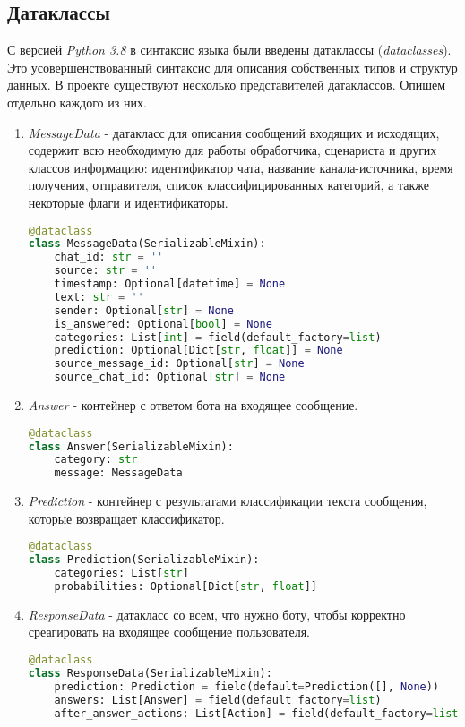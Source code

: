     \subsection{Датаклассы}
    С версией \textit{Python 3.8} в синтаксис языка были введены датаклассы (\textit{dataclasses}).
    Это усовершенствованный синтаксис для описания собственных типов и структур данных.
    В проекте существуют несколько представителей датаклассов. Опишем отдельно каждого из них.
    \begin{enumerate}
        \item \textit{MessageData} - датакласс для описания сообщений входящих и исходящих,
        содержит всю необходимую для работы обработчика, сценариста и других классов информацию:
        идентификатор чата, название канала-источника, время получения, отправителя,
        список классифицированных категорий, а также некоторые флаги и идентификаторы.
\begin{lstlisting}[language=Python]
@dataclass
class MessageData(SerializableMixin):
    chat_id: str = ''
    source: str = ''
    timestamp: Optional[datetime] = None
    text: str = ''
    sender: Optional[str] = None
    is_answered: Optional[bool] = None
    categories: List[int] = field(default_factory=list)
    prediction: Optional[Dict[str, float]] = None
    source_message_id: Optional[str] = None
    source_chat_id: Optional[str] = None
\end{lstlisting}

        \item \textit{Answer} - контейнер с ответом бота на входящее сообщение.
\begin{lstlisting}[language=Python]
@dataclass
class Answer(SerializableMixin):
    category: str
    message: MessageData
\end{lstlisting}

        \item \textit{Prediction} - контейнер с результатами классификации текста сообщения,
        которые возвращает классификатор.
\begin{lstlisting}[language=Python]
@dataclass
class Prediction(SerializableMixin):
    categories: List[str]
    probabilities: Optional[Dict[str, float]]
\end{lstlisting}

        \item \textit{ResponseData} - датакласс со всем, что нужно боту, чтобы корректно
        среагировать на входящее сообщение пользователя.
\begin{lstlisting}[language=Python]
@dataclass
class ResponseData(SerializableMixin):
    prediction: Prediction = field(default=Prediction([], None))
    answers: List[Answer] = field(default_factory=list)
    after_answer_actions: List[Action] = field(default_factory=list)
\end{lstlisting}
    \end{enumerate}

